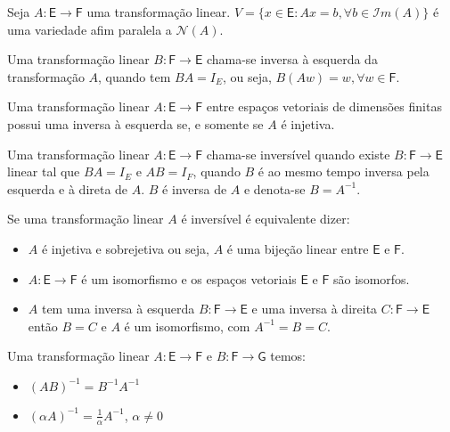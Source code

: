 \documentclass[10pt,a4paper]{article}
\begin{document}
\begin{theorem}
	Seja $A: \textsf{E} \rightarrow \textsf{F}$ uma transformação linear. $V = \{x \in \textsf{E} : Ax = b, \forall b \in \mathcal{I}m(A)\}$ é uma variedade afim paralela a $\mathcal{N}(A)$.
\end{theorem}


\begin{definition}
	Uma transformação linear $B: \textsf{F} \rightarrow \textsf{E}$ chama-se inversa à esquerda da transformação $A$, quando tem $BA = I_E$, ou seja, $B(Aw) = w, \forall w \in \textsf{F}$.
\end{definition}

\begin{theorem}
	Uma transformação linear $A: \textsf{E} \rightarrow \textsf{F}$ entre espaços vetoriais de dimensões finitas possui uma inversa à esquerda se, e somente se $A$ é injetiva.
\end{theorem}

\begin{definition}
	Uma transformação linear $A: \textsf{E} \rightarrow \textsf{F}$ chama-se inversível quando existe $B: \textsf{F} \rightarrow \textsf{E}$ linear tal que $BA = I_E$ e $AB = I_F$, quando $B$ é ao mesmo tempo inversa pela esquerda e à direta de $A$. $B$ é inversa de $A$ e denota-se $B = A^{-1}$.
\end{definition}

\begin{theorem}
	Se uma transformação linear $A$ é inversível é equivalente dizer:
	\begin{itemize}
		\item $A$ é injetiva e sobrejetiva ou seja, $A$ é uma bijeção linear entre $\textsf{E}$ e $\textsf{F}$.
		\item $A: \textsf{E} \rightarrow \textsf{F}$ é um isomorfismo e os espaços vetoriais $\textsf{E}$ e $\textsf{F}$ são isomorfos.
		\item $A$ tem uma inversa à esquerda $B:\textsf{F} \rightarrow \textsf{E}$ e uma inversa à direita $C:\textsf{F} \rightarrow \textsf{E}$ então $B = C$ e $A$ é um isomorfismo, com $A^{-1} = B = C$.
	\end{itemize}
\end{theorem}

\begin{theorem}
	Uma transformação linear $A: \textsf{E} \rightarrow \textsf{F}$ e $B: \textsf{F} \rightarrow \textsf{G}$ temos:
	\begin{itemize}
	\item $(AB)^{-1} = B^{-1}A^{-1}$
	\item $(\alpha A)^{-1} = \frac{1}{\alpha}A^{-1}$, $\alpha \neq 0$
	\end{itemize}
\end{theorem}
\end{document}
